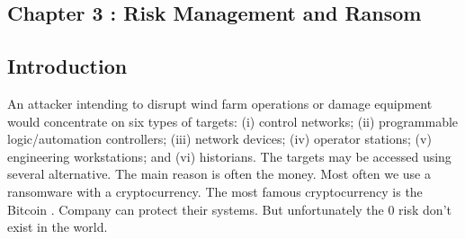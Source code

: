 \documentclass[twosided,a4,10pt]{article}
\begin{document}
\begin{multicols}{2}
\section{Chapter 3 : Risk Management and Ransom } 
\subsection{Introduction}
An attacker intending to disrupt wind farm operations or damage equipment would concentrate on six types of targets: (i) control networks; (ii) programmable logic/automation controllers; (iii) network devices; (iv) operator stations; (v) engineering workstations; and (vi) historians. The targets may be accessed using several alternative. The main reason is often the money. Most often we use a ransomware with a cryptocurrency. The most famous cryptocurrency is the Bitcoin . Company can protect their systems. But unfortunately the 0 risk don't exist in the world.


\end{multicols}
\end{document}

